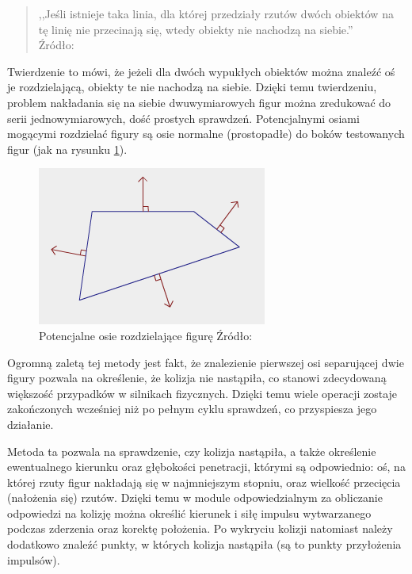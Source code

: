 \begin{quotation}
	,,Jeśli istnieje taka linia, dla której przedziały rzutów dwóch obiektów na tę linię nie przecinają się, wtedy obiekty nie nachodzą na siebie.'' \\
	Źródło: \cite[tłum. własne]{bib:eberlysat}
\end{quotation}

Twierdzenie to mówi, że jeżeli dla dwóch wypukłych obiektów można znaleźć oś je rozdzielającą, obiekty te nie nachodzą na siebie. Dzięki temu twierdzeniu, problem nakładania się na siebie dwuwymiarowych figur można zredukować do serii jednowymiarowych, dość prostych sprawdzeń. Potencjalnymi osiami mogącymi rozdzielać figury są osie normalne (prostopadłe) do boków testowanych figur (jak na rysunku \ref{fig:potencjalneosie}).
\begin{figure}[h]
	\centering	
	\includegraphics[width=0.6\linewidth]{images/potencjalneosie}
	\caption[Potencjalne osie rozdzielające figurę]{Potencjalne osie rozdzielające figurę\newline 
		Źródło: \cite{bib:ncollision}}
	\label{fig:potencjalneosie}
\end{figure}

Ogromną zaletą tej metody jest fakt, że znalezienie pierwszej osi separującej dwie figury pozwala na określenie, że kolizja nie nastąpiła, co stanowi zdecydowaną większość przypadków w silnikach fizycznych. Dzięki temu wiele operacji zostaje zakończonych wcześniej niż po pełnym cyklu sprawdzeń, co przyspiesza jego działanie. 

Metoda ta pozwala na sprawdzenie, czy kolizja nastąpiła, a także określenie ewentualnego kierunku oraz głębokości penetracji, którymi są odpowiednio: oś, na której rzuty figur nakładają się w najmniejszym stopniu, oraz wielkość przecięcia (nałożenia się) rzutów. Dzięki temu w module odpowiedzialnym za obliczanie odpowiedzi na kolizję można określić kierunek i siłę impulsu wytwarzanego podczas zderzenia oraz korektę położenia. Po wykryciu kolizji natomiast należy dodatkowo znaleźć punkty, w których kolizja nastąpiła (są to punkty przyłożenia impulsów). 

